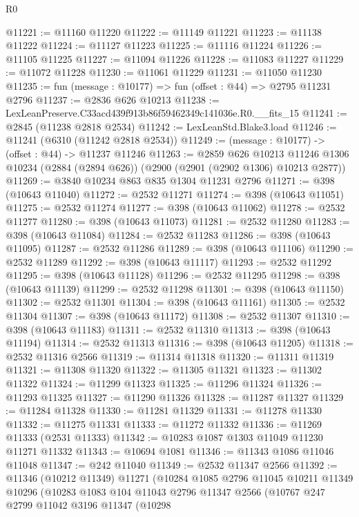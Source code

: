 \begin{lexlean}{R0}
\begin{coremodule}
@11221 := @11160 @11220
@11222 := @11149 @11221
@11223 := @11138 @11222
@11224 := @11127 @11223
@11225 := @11116 @11224
@11226 := @11105 @11225
@11227 := @11094 @11226
@11228 := @11083 @11227
@11229 := @11072 @11228
@11230 := @11061 @11229
@11231 := @11050 @11230
@11235 := fun (message : @10177) => fun (offset : @44) => @2795 @11231 @2796
@11237 := @2836 @626 @10213
@11238 := LexLeanPreserve.C33acd439f913b86f59462349c141036e.R0.__fits_15
@11241 := @2845 (@11238 @2818 @2534)
@11242 := LexLeanStd.Blake3.load
@11246 := @11241 (@6310 (@11242 @2818 @2534))
@11249 := (message : @10177) -> (offset : @44) -> @11237 @11246
@11263 := @2859
    @626
    @10213
    @11246
    @1306
    @10234
    (@2884 (@2894 @626))
    (@2900 (@2901 (@2902 @1306) @10213 @2877))
@11269 := @3840 @10234 @863 @835 @1304 @11231 @2796
@11271 := @398 (@10643 @11040)
@11272 := @2532 @11271
@11274 := @398 (@10643 @11051)
@11275 := @2532 @11274
@11277 := @398 (@10643 @11062)
@11278 := @2532 @11277
@11280 := @398 (@10643 @11073)
@11281 := @2532 @11280
@11283 := @398 (@10643 @11084)
@11284 := @2532 @11283
@11286 := @398 (@10643 @11095)
@11287 := @2532 @11286
@11289 := @398 (@10643 @11106)
@11290 := @2532 @11289
@11292 := @398 (@10643 @11117)
@11293 := @2532 @11292
@11295 := @398 (@10643 @11128)
@11296 := @2532 @11295
@11298 := @398 (@10643 @11139)
@11299 := @2532 @11298
@11301 := @398 (@10643 @11150)
@11302 := @2532 @11301
@11304 := @398 (@10643 @11161)
@11305 := @2532 @11304
@11307 := @398 (@10643 @11172)
@11308 := @2532 @11307
@11310 := @398 (@10643 @11183)
@11311 := @2532 @11310
@11313 := @398 (@10643 @11194)
@11314 := @2532 @11313
@11316 := @398 (@10643 @11205)
@11318 := @2532 @11316 @2566
@11319 := @11314 @11318
@11320 := @11311 @11319
@11321 := @11308 @11320
@11322 := @11305 @11321
@11323 := @11302 @11322
@11324 := @11299 @11323
@11325 := @11296 @11324
@11326 := @11293 @11325
@11327 := @11290 @11326
@11328 := @11287 @11327
@11329 := @11284 @11328
@11330 := @11281 @11329
@11331 := @11278 @11330
@11332 := @11275 @11331
@11333 := @11272 @11332
@11336 := @11269 @11333 (@2531 @11333)
@11342 := @10283 @1087 @1303 @11049 @11230 @11271 @11332
@11343 := @10694 @1081
@11346 := @11343 @1086 @11046 @11048
@11347 := @242 @11040
@11349 := @2532 @11347 @2566
@11392 := @11346
    (@10212 @11349)
    @11271
    (@10284
      @1085
      @2796
      @11045
      @10211
      @11349
      @10296
      (@10283
        @1083
        @104
        @11043
        @2796
        @11347
        @2566
        (@10767
          @247
          @2799
          @11042
          @3196
          @11347
          (@10298

\end{coremodule}
\end{lexlean}
